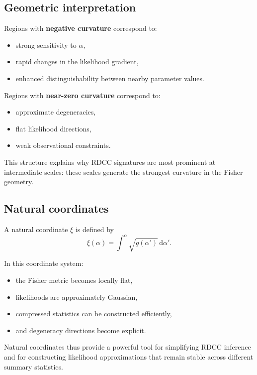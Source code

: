 \documentclass[11pt,a4paper]{article}
\begin{document}
\subsection{Geometric interpretation}

Regions with \textbf{negative curvature} correspond to:
\begin{itemize}
    \item strong sensitivity to $\alpha$,
    \item rapid changes in the likelihood gradient,
    \item enhanced distinguishability between nearby parameter values.
\end{itemize}

Regions with \textbf{near-zero curvature} correspond to:
\begin{itemize}
    \item approximate degeneracies,
    \item flat likelihood directions,
    \item weak observational constraints.
\end{itemize}

This structure explains why RDCC signatures are most prominent at intermediate 
scales: these scales generate the strongest curvature in the Fisher geometry.

\subsection{Natural coordinates}

A natural coordinate $\xi$ is defined by
\begin{equation}
\xi(\alpha)
=
\int^{\alpha} \sqrt{g(\alpha')} \, \mathrm{d}\alpha'.
\end{equation}

In this coordinate system:
\begin{itemize}
    \item the Fisher metric becomes locally flat,
    \item likelihoods are approximately Gaussian,
    \item compressed statistics can be constructed efficiently,
    \item and degeneracy directions become explicit.
\end{itemize}

Natural coordinates thus provide a powerful tool for simplifying RDCC inference 
and for constructing likelihood approximations that remain stable across 
different summary statistics.
\end{document}
